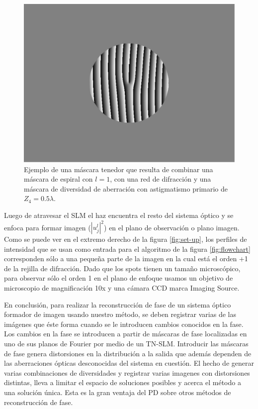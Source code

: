 \begin{figure}[h!]
\centering
\includegraphics[scale=.5]{mixed_mask.pdf}
\caption[Ejemplo de una máscara tenedor con astigmatismo.]{Ejemplo de una máscara tenedor que resulta de combinar una
  máscara de espiral con $l=1$, con una red de difracción y una
  máscara de diversidad de aberración con astigmatismo primario de
  $Z_4=0.5\lambda$.} 
\label{fig:mixed_mask}
\end{figure}

Luego de atravesar el SLM el haz encuentra el resto del sistema óptico
y se enfoca para formar imagen ($|u_j^l|^2$) en el plano de observación o plano
imagen. 
Como se puede ver en el extremo derecho de la figura \ref{fig:set-up},
los perfiles de intensidad que se usan como entrada para el algoritmo
de la figura \ref{fig:flowchart} corresponden sólo a una pequeña parte
de la imagen en la cual está el orden +1 de la rejilla de
difracción. Dado que los spots tienen un tamaño microscópico, para observar sólo
el orden 1 en el plano de enfoque usamos un objetivo de 
microscopio de magnificación 10x y una cámara CCD marca Imaging
Source.    

En conclusión, para realizar la reconstrucción de fase de un sistema
óptico formador de imagen usando nuestro método, se deben registrar varias de las
imágenes que éste forma cuando se le introducen cambios conocidos en
la fase. Los cambios en la fase se introducen a partir de máscaras de
fase localizadas en uno de sus planos de Fourier por medio de un
TN-SLM.  
Introducir las máscaras de fase genera distorsiones en la distribución
a la salida que además dependen de las aberraciones ópticas desconocidas del
sistema en cuestión. El hecho de generar varias combinaciones de
diversidades y registrar varias imagenes con distorsiones distintas,
lleva a limitar el espacio de soluciones posibles y acerca el método a
una solución única. Esta es la gran ventaja del PD sobre otros métodos
de reconstrucción de fase. 

